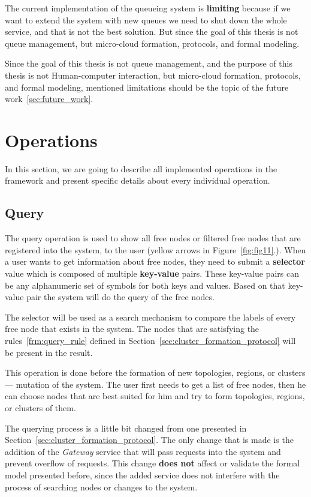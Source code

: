 The current implementation of the queueing system is \textbf{limiting} because if we want to extend the system with new queues we need to shut down the whole service, and that is not the best solution. But since the goal of this thesis is not queue management, but micro-cloud formation, protocols, and formal modeling.

Since the goal of this thesis is not queue management, and the purpose of this thesis is not Human-computer interaction, but micro-cloud formation, protocols, and formal modeling, mentioned limitations should be the topic of the future work~\ref{sec:future_work}.
%
%
\section{Operations}\label{sec:framework_operations}
%
In this section, we are going to describe all implemented operations in the framework and present specific details about every individual operation.
%
%
\subsection{Query}\label{sec:query} 
% 
The query operation is used to show all free nodes or filtered free nodes that are registered into the system, to the user (yellow arrows in Figure~\ref{fig:fig11}.). When a user wants to get information about free nodes, they need to submit a \textbf{selector} value which is composed of multiple \textbf{key-value} pairs.  These key-value pairs can be any alphanumeric set of symbols for both keys and values. Based on that key-value pair the system will do the query of the free nodes.

The selector will be used as a search mechanism to compare the labels of every free node that exists in the system. The nodes that are satisfying the rules~\ref{frm:query_rule} defined in Section~\ref{sec:cluster_formation_protocol} will be present in the result.

This operation is done before the formation of new topologies, regions, or clusters --- mutation of the system. The user first needs to get a list of free nodes, then he can choose nodes that are best suited for him and try to form topologies, regions, or clusters of them.

The querying process is a little bit changed from one presented in Section~\ref{sec:cluster_formation_protocol}. The only change that is made is the addition of the \emph{Gateway} service that will pass requests into the system and prevent overflow of requests. This change \textbf{does not} affect or validate the formal model presented before, since the added service does not interfere with the process of searching nodes or changes to the system.

